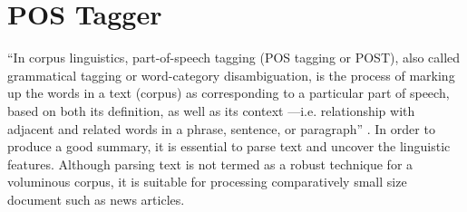 \section{POS Tagger}
``In corpus linguistics, part-of-speech tagging (POS tagging or POST), also called grammatical tagging or word-category disambiguation, is the process of marking up the
words in a text (corpus) as corresponding to a particular part of speech, based on both its definition, as well as its context —i.e. relationship with adjacent and 
related words in a phrase, sentence, or paragraph'' . In order to produce a good summary, it is essential to parse text and uncover the linguistic features.
Although parsing text is not termed as a robust technique for a voluminous corpus, it is suitable for processing comparatively small size document such as news articles. 


\clearpage
   
 